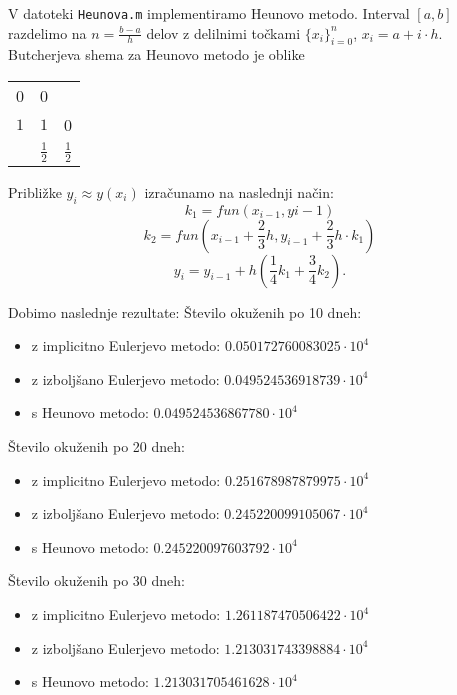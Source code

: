 \documentclass[a4paper,12pt]{article}
\begin{document}
V datoteki \texttt{Heunova.m} implementiramo Heunovo metodo.
Interval \([a,b]\) razdelimo na \(n=\frac{b-a}{h}\) delov z delilnimi
točkami \(\{x_i\}_{i=0}^{n}\), \(x_i=a+i\cdot h\).
Butcherjeva shema za Heunovo metodo je oblike
\begin{center}
\begin{tabular}{c|cc}
0 & 0 &  \\
$ 1 $ & $ 1 $ & 0 \\ \hline
& $\frac{1}{2}$ & $\frac{1}{2}$ 
\end{tabular}
\end{center}
Približke \(y_i\approx y(x_i)\) izračunamo na naslednji način:
$$k_1=fun(x_{i-1},y{i-1})$$
$$k_2=fun(x_{i-1}+\frac{2}{3}h,y_{i-1}+\frac{2}{3}h\cdot k_1)$$
$$y_i=y_{i-1}+h(\frac{1}{4}k_1+\frac{3}{4}k_2).$$

Dobimo naslednje rezultate:
Število okuženih po 10 dneh:
\begin{itemize}
    \item z implicitno Eulerjevo metodo: $0.050172760083025 \cdot 10^4$
    \item z izboljšano Eulerjevo metodo: $0.049524536918739 \cdot 10^4$
    \item s Heunovo metodo: $0.049524536867780 \cdot 10^4$
\end{itemize}

Število okuženih po 20 dneh:
\begin{itemize}
    \item z implicitno Eulerjevo metodo: $0.251678987879975 \cdot 10^4$
    \item z izboljšano Eulerjevo metodo: $0.245220099105067 \cdot 10^4$
    \item s Heunovo metodo: $0.245220097603792 \cdot 10^4$
\end{itemize}

Število okuženih po 30 dneh:
\begin{itemize}
    \item z implicitno Eulerjevo metodo: $1.261187470506422 \cdot 10^4$
    \item z izboljšano Eulerjevo metodo: $1.213031743398884 \cdot 10^4$
    \item s Heunovo metodo: $1.213031705461628 \cdot 10^4$
\end{itemize}
\end{document}
